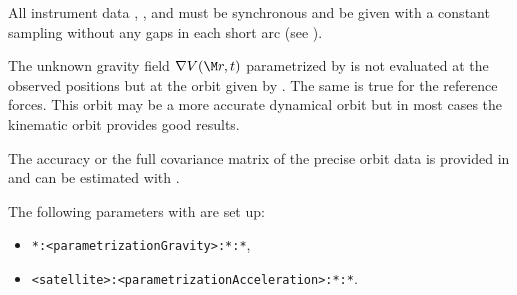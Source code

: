 All instrument data , ,
and  must be synchronous and be given
with a constant sampling without any gaps in each short arc (see ).

The unknown gravity field $\nabla V(\M r, t)$ parametrized by 
is not evaluated at the observed positions but at the orbit given by .
The same is true for the reference forces. This orbit may be a more accurate dynamical orbit but
in most cases the kinematic orbit provides good results.

The accuracy or the full covariance matrix of the precise orbit data is provided in
 and can be estimated with .

The following parameters with  are set up:
\begin{itemize}
\item \verb|*:<parametrizationGravity>:*:*|,
\item \verb|<satellite>:<parametrizationAcceleration>:*:*|.
\end{itemize}


